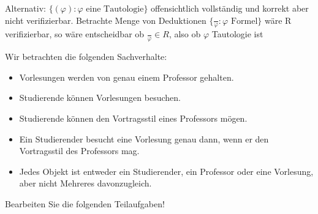 \documentclass[10pt, a4paper]{exam}
\begin{document}
\begin{questions}
\begin{parts}
\begin{solution}
            Alternativ: $\{(\varphi): \varphi\text{ eine Tautologie}\}$ offensichtlich vollständig und korrekt aber nicht verifizierbar. Betrachte Menge von Deduktionen $\{\frac{}{\varphi}: \varphi\text{ Formel}\}$ wäre R verifizierbar, so wäre entscheidbar ob $\frac{}{\varphi}\in R$, also ob $\varphi$ Tautologie ist
        \end{solution}
    \end{parts}

    \question Wir betrachten die folgenden Sachverhalte:
    \begin{itemize}
        \item Vorlesungen werden von genau einem Professor gehalten.
        \item Studierende können Vorlesungen besuchen.
        \item Studierende können den Vortragsstil eines Professors mögen.
        \item Ein Studierender besucht eine Vorlesung genau dann, wenn er den Vortragsstil des Professors mag.
        \item Jedes Objekt ist entweder ein Studierender, ein Professor oder eine Vorlesung, aber nicht Mehreres davonzugleich.
    \end{itemize}
    Bearbeiten Sie die folgenden Teilaufgaben!
\end{questions}
\end{document}
